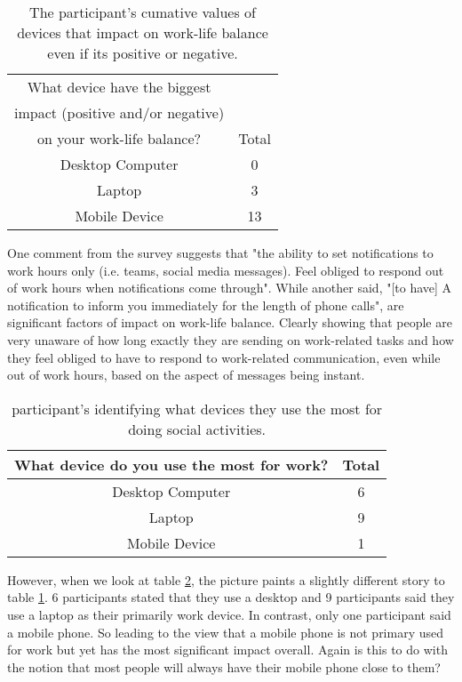 \documentclass{sigchi}
\begin{document}
	\begin{table}[ht]
		\centering
		\small
		\begin{tabular}[t]{ |c| c | }
			\hline
			What device have the biggest & \\
			impact (positive and/or negative) & \\
			on your work-life balance?  & Total  \\ 
			\hline
			Desktop Computer & 0 \\ 
			\hline
			Laptop & 3  \\ 
			\hline
			Mobile Device &  13 \\
			\hline
			
		\end{tabular}
		\caption{The participant's cumative values of devices that impact on work-life balance even if its positive or negative.}
		\label{tab:device_impact}
	\end{table}%
	
	One comment from the survey suggests that "the ability to set notifications to work hours only (i.e. teams, social media messages). Feel obliged to respond out of work hours when notifications come through". While another said, "[to have] A notification to inform you immediately for the length of phone calls", are significant factors of impact on work-life balance. Clearly showing that people are very unaware of how long exactly they are sending on work-related tasks and how they feel obliged to have to respond to work-related communication, even while out of work hours, based on the aspect of messages being instant.
	
	
	\begin{table}[ht]
		\centering
		\small
		\begin{tabular}[t]{ |c| c | }
			\hline
			What device do you use the most for work? & Total  \\ 
			\hline
			Desktop Computer & 6 \\ 
			\hline
			Laptop & 9  \\ 
			\hline
			Mobile Device &  1 \\
			\hline
		\end{tabular}
		\caption{participant's identifying what devices they use the most for doing social activities.}
		\label{tab:device_work}
	\end{table}%


	However, when we look at table \ref{tab:device_work}, the picture paints a slightly different story to table \ref{tab:device_impact}. 6 participants stated that they use a desktop and 9 participants said they use a laptop as their primarily work device. In contrast, only one participant said a mobile phone. So leading to the view that a mobile phone is not primary used for work but yet has the most significant impact overall. Again is this to do with the notion that most people will always have their mobile phone close to them?
	
\end{document}
